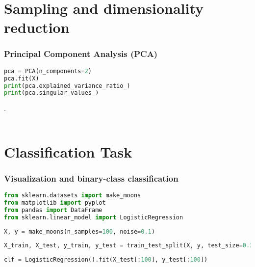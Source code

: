 \documentclass[onecolumn]{article}
\begin{document}
\section{ Sampling and dimensionality reduction}
\label{sec:3}


\subsubsection{Principal Component Analysis (PCA)  }
\label{sec:3.0.1}

\begin{lstlisting}[language=Python, caption=load a dataset from sklearn module] 
pca = PCA(n_components=2)
pca.fit(X)
print(pca.explained_variance_ratio_)
print(pca.singular_values_)
\end{lstlisting} 
.\\\\
\section{Classification Task}
\label{sec:3}

\subsubsection{Visualization and binary-class classification}
\label{sec:3.0.1}

\begin{lstlisting}[language=Python, caption=extra libraries] 
from sklearn.datasets import make_moons
from matplotlib import pyplot
from pandas import DataFrame
from sklearn.linear_model import LogisticRegression 
\end{lstlisting} 

\begin{lstlisting}[language=Python, caption=load a dataset from sklearn module] 
X, y = make_moons(n_samples=100, noise=0.1)
\end{lstlisting} 

\begin{lstlisting}[language=Python, caption= training and testing] 
X_train, X_test, y_train, y_test = train_test_split(X, y, test_size=0.3, random_state=42)
\end{lstlisting} 

\begin{lstlisting}[language=Python, caption= logistic regression algorithm with SGD solver] 
clf = LogisticRegression().fit(X_test[:100], y_test[:100])
\end{lstlisting} 
\end{document}
